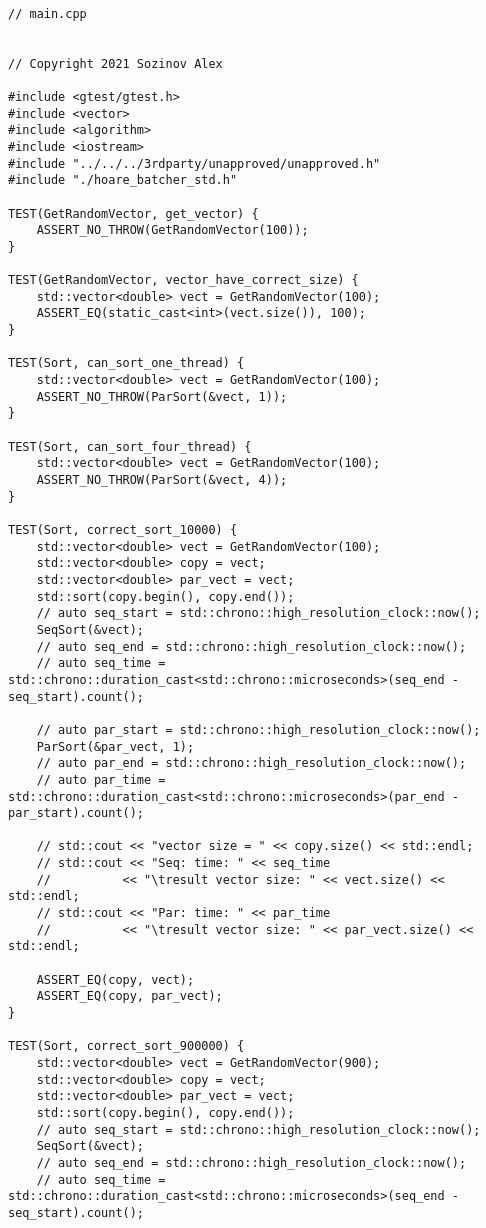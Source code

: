 \documentclass{report}
\begin{document}
\begin{lstlisting}

// main.cpp


// Copyright 2021 Sozinov Alex

#include <gtest/gtest.h>
#include <vector>
#include <algorithm>
#include <iostream>
#include "../../../3rdparty/unapproved/unapproved.h"
#include "./hoare_batcher_std.h"

TEST(GetRandomVector, get_vector) {
    ASSERT_NO_THROW(GetRandomVector(100));
}

TEST(GetRandomVector, vector_have_correct_size) {
    std::vector<double> vect = GetRandomVector(100);
    ASSERT_EQ(static_cast<int>(vect.size()), 100);
}

TEST(Sort, can_sort_one_thread) {
    std::vector<double> vect = GetRandomVector(100);
    ASSERT_NO_THROW(ParSort(&vect, 1));
}

TEST(Sort, can_sort_four_thread) {
    std::vector<double> vect = GetRandomVector(100);
    ASSERT_NO_THROW(ParSort(&vect, 4));
}

TEST(Sort, correct_sort_10000) {
    std::vector<double> vect = GetRandomVector(100);
    std::vector<double> copy = vect;
    std::vector<double> par_vect = vect;
    std::sort(copy.begin(), copy.end());
    // auto seq_start = std::chrono::high_resolution_clock::now();
    SeqSort(&vect);
    // auto seq_end = std::chrono::high_resolution_clock::now();
    // auto seq_time = std::chrono::duration_cast<std::chrono::microseconds>(seq_end - seq_start).count();

    // auto par_start = std::chrono::high_resolution_clock::now();
    ParSort(&par_vect, 1);
    // auto par_end = std::chrono::high_resolution_clock::now();
    // auto par_time = std::chrono::duration_cast<std::chrono::microseconds>(par_end - par_start).count();

    // std::cout << "vector size = " << copy.size() << std::endl;
    // std::cout << "Seq: time: " << seq_time
    //          << "\tresult vector size: " << vect.size() << std::endl;
    // std::cout << "Par: time: " << par_time
    //          << "\tresult vector size: " << par_vect.size() << std::endl;

    ASSERT_EQ(copy, vect);
    ASSERT_EQ(copy, par_vect);
}

TEST(Sort, correct_sort_900000) {
    std::vector<double> vect = GetRandomVector(900);
    std::vector<double> copy = vect;
    std::vector<double> par_vect = vect;
    std::sort(copy.begin(), copy.end());
    // auto seq_start = std::chrono::high_resolution_clock::now();
    SeqSort(&vect);
    // auto seq_end = std::chrono::high_resolution_clock::now();
    // auto seq_time = std::chrono::duration_cast<std::chrono::microseconds>(seq_end - seq_start).count();


\end{lstlisting}
\end{document}
